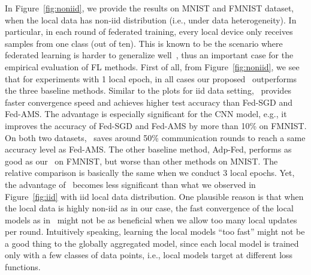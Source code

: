 \documentclass[nohyperref]{article}
\begin{document}
In Figure~\ref{fig:noniid}, we provide the results on  MNIST and FMNIST dataset, when the local data has non-iid distribution (i.e., under data heterogeneity). In particular, in each round of federated training, every local device only receives samples from one class (out of ten). This is known to be the scenario where federated learning is harder to generalize well~\citep{mcmahan2017communication}, thus an important case for the empirical evaluation of FL methods. 
First of all, from Figure~\ref{fig:noniid}, we see that for experiments with 1 local epoch, in all cases our proposed \algo\ outperforms the three baseline methods. Similar to the plots for iid data setting, \algo\ provides faster convergence speed and achieves higher test accuracy than Fed-SGD and Fed-AMS. The advantage is especially significant for the CNN model, e.g., it improves the accuracy of Fed-SGD and Fed-AMS by more than 10\% on FMNIST. On both two datasets, \algo\ saves around 50\% communication rounds to reach a same accuracy level as Fed-AMS. The other baseline method, Adp-Fed, performs as good as our \algo\ on FMNIST, but worse than other methods on MNIST.
The relative comparison is basically the same when we conduct 3 local epochs. Yet, the advantage of \algo\ becomes less significant than what we observed in Figure~\ref{fig:iid} with iid local data distribution. One plausible reason is that when the local data is highly non-iid as in our case, the fast convergence of the local models as in \algo\ might not be as beneficial when we allow too many local updates per round. Intuitively speaking, learning the local models ``too fast'' might not be a good thing to the globally aggregated model, since each local model is trained only with a few classes of data points, i.e., local models target at different loss functions.
\end{document}
